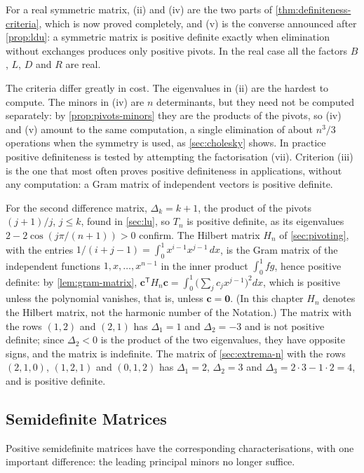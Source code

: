 For a real symmetric matrix, (ii) and (iv) are the two parts of \cref{thm:definiteness-criteria}, which is now proved completely, and (v) is the converse announced after \cref{prop:ldu}: a symmetric matrix is positive definite exactly when elimination without exchanges produces only positive pivots. In the real case all the factors $B$, $L$, $D$ and $R$ are real.

The criteria differ greatly in cost. The eigenvalues in (ii) are the hardest to compute. The minors in (iv) are $n$ determinants, but they need not be computed separately: by \cref{prop:pivots-minors} they are the products of the pivots, so (iv) and (v) amount to the same computation, a single elimination of about $n^3/3$ operations when the symmetry is used, as \cref{sec:cholesky} shows. In practice positive definiteness is tested by attempting the factorisation (vii). Criterion (iii) is the one that most often proves positive definiteness in applications, without any computation: a Gram matrix of independent vectors is positive definite.

For the second difference matrix, $\Delta_k=k+1$, the product of the pivots $(j+1)/j$, $j\le k$, found in \cref{sec:lu}, so $T_n$ is positive definite, as its eigenvalues $2-2\cos(j\pi/(n+1))>0$ confirm. The Hilbert matrix $H_n$ of \cref{sec:pivoting}, with the entries $1/(i+j-1)=\int_0^1x^{i-1}x^{j-1}\,dx$, is the Gram matrix of the independent functions $1,x,\ldots,x^{n-1}$ in the inner product $\int_0^1fg$, hence positive definite: by \cref{lem:gram-matrix}, $\mathbf c^{\mathsf T}H_n\mathbf c=\int_0^1\bigl(\sum_jc_jx^{j-1}\bigr)^2dx$, which is positive unless the polynomial vanishes, that is, unless $\mathbf c=\mathbf 0$. (In this chapter $H_n$ denotes the Hilbert matrix, not the harmonic number of the Notation.) The matrix with the rows $(1,2)$ and $(2,1)$ has $\Delta_1=1$ and $\Delta_2=-3$ and is not positive definite; since $\Delta_2<0$ is the product of the two eigenvalues, they have opposite signs, and the matrix is indefinite. The matrix of \cref{sec:extrema-n} with the rows $(2,1,0)$, $(1,2,1)$ and $(0,1,2)$ has $\Delta_1=2$, $\Delta_2=3$ and $\Delta_3=2\cdot3-1\cdot2=4$, and is positive definite.

\subsection{Semidefinite Matrices}

Positive semidefinite matrices have the corresponding characterisations, with one important difference: the leading principal minors no longer suffice.

